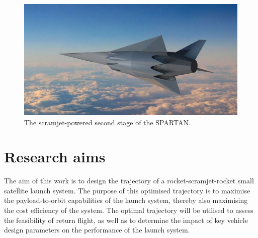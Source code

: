   	  	\begin{figure}[ht]
  	  		\centering
  	  		\includegraphics[width=0.7\linewidth]{figures/1_introduction/project-spartan}
  	  		\caption{The scramjet-powered second stage of the SPARTAN\cite{BBC}.}
  	  		\label{fig:project-spartan}
  	  	\end{figure}
  	  	

  \section{Research aims}

    The aim of this work is to design the trajectory of a rocket-scramjet-rocket small satellite launch system. The purpose of this optimised trajectory is to maximise the payload-to-orbit capabilities of the launch system, thereby also maximising the cost efficiency of the system. The optimal trajectory will be utilised to assess the feasibility of return flight, as well as to determine the impact of key vehicle design parameters on the performance of the launch system. 
 
